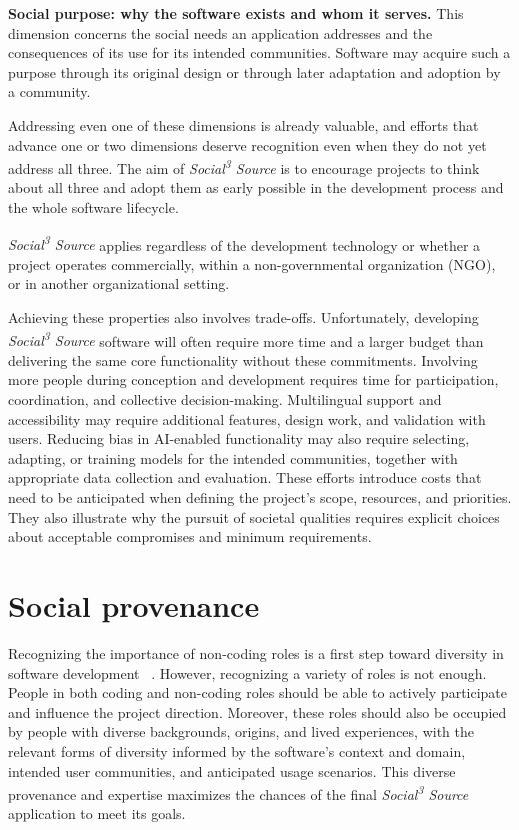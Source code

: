 \documentclass[11pt,a4paper]{article}
\newcommand{\socialsource}{\texorpdfstring{\textit{Social\textsuperscript{3} Source}}{Social3 Source}}
\begin{document}
\textbf{Social purpose: why the software exists and whom it serves.}
This dimension concerns the social needs an application addresses and the consequences of its use for its intended communities.
Software may acquire such a purpose through its original design or through later adaptation and adoption by a community.


Addressing even one of these dimensions is already valuable, and efforts that advance one or two dimensions deserve recognition even when they do not yet address all three.
The aim of \socialsource{} is to encourage projects to think about all three and adopt them as early possible in the development process and the whole software lifecycle. 

\socialsource{} applies regardless of the development technology or whether a project operates commercially, within a non-governmental organization (NGO), or in another organizational setting.

Achieving these properties also involves trade-offs.
Unfortunately, developing \socialsource{} software will often require more time and a larger budget than delivering the same core functionality without these commitments.
Involving more people during conception and development requires time for participation, coordination, and collective decision-making.
Multilingual support and accessibility may require additional features, design work, and validation with users.
Reducing bias in AI-enabled functionality may also require selecting, adapting, or training models for the intended communities, together with appropriate data collection and evaluation.
These efforts introduce costs that need to be anticipated when defining the project's scope, resources, and priorities.
They also illustrate why the pursuit of societal qualities requires explicit choices about acceptable compromises and minimum requirements.

\section{Social provenance}
\label{sec:provenance}

Recognizing the importance of non-coding roles is a first step toward diversity in software development ~\cite{Canovas2022NonCoding}. 
However, recognizing a variety of roles is not enough.
People in both coding and non-coding roles should be able to actively participate and influence the project direction. 
Moreover, these roles should also be occupied by people with diverse backgrounds, origins, and lived experiences, with the relevant forms of diversity informed by the software's context and domain, intended user communities, and anticipated usage scenarios.
This diverse provenance and expertise maximizes the chances of the final \socialsource{} application to meet its goals.
\end{document}
